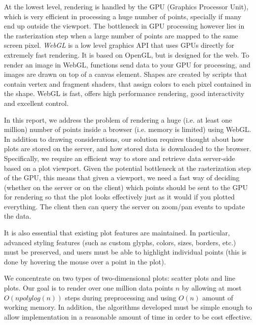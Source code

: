 \documentclass[11pt,a4paper]{article}
\begin{document}
At the lowest level, rendering is handled by the GPU (Graphics Processor Unit), which is very efficient
in processing a huge number of points, specially if many end up outside the viewport. 
The bottleneck in GPU processing however lies in the rasterization step when a large number of points
are mapped to the same screen pixel. 
\emph{WebGL} is a low level graphics API that uses GPUs directly for extremely fast rendering. 
It is based on OpenGL, but is designed for the web. 
To render an image in WebGL, functions send data to your GPU for processing, 
and images are drawn on top of a canvas element. Shapes are created by scripts that contain 
vertex and fragment shaders, that assign colors to each pixel contained in the shape.
WebGL is fast, offers high performance rendering, good interactivity and excellent control. 


In this report, we address the problem of rendering a huge (i.e. at least one million) number of points
inside a browser (i.e. memory is limited) using WebGL.
%
In addition to drawing considerations, our solution requires thought about how plots are stored on the server, 
and how stored data is downloaded to the browser. 
Specifically, we require an efficient way to store and retrieve data server-side based on a plot viewport.
Given the potential bottleneck at the rasterization step of the GPU, this means that given a viewport, 
we need a fast way of deciding (whether on the server or on the client) which points should be sent to the GPU for rendering 
so that the plot looks effectively just as it would if you plotted everything.
The client then can query the server on zoom/pan events to update the data. 
%

It is also essential that existing plot features are maintained. 
In particular, advanced styling features (such as custom glyphs, colors, sizes, borders, etc.) must be preserved, 
and users must be able to highlight individual points (this is done by hovering the mouse over a point in the plot). 

We concentrate on two types of two-dimensional plots: scatter plots and line plots.  
Our goal is to render over one million data points $n$ by allowing at most $O(n polylog(n))$ steps during preprocessing 
and using $O(n)$ amount of working memory. 
In addition, the algorithms developed must be simple enough to allow implementation in a reasonable amount of time in order to be cost effective.
\end{document}

